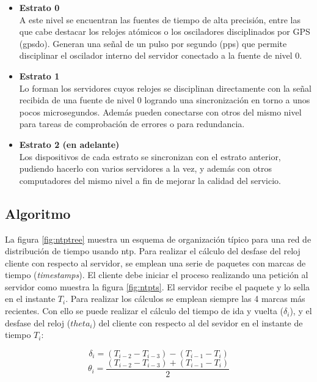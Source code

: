 \begin{itemize}
	\item \textbf{Estrato 0} \\ A este nivel se encuentran las fuentes de 
	tiempo de alta precisión, entre las que cabe destacar los relojes atómicos 
	o los osciladores disciplinados por GPS (\acrshort{gpsdo}). Generan una 
	señal de un pulso por segundo (\acrshort{pps}) que permite disciplinar el 
	oscilador interno del servidor conectado a la fuente de nivel 0.
	
	\item \textbf{Estrato 1} \\ Lo forman los servidores cuyos relojes se 
	disciplinan directamente con la señal recibida de una fuente de nivel 0 
	logrando una sincronización en torno a unos pocos microsegundos. Además 
	pueden conectarse con otros del mismo nivel para tareas de comprobación de 
	errores o para redundancia.
	
	\item \textbf{Estrato 2 (en adelante)} \\ Los dispositivos de cada estrato 
	se 
	sincronizan con el estrato anterior, pudiendo hacerlo con varios servidores 
	a la vez, y además con otros computadores del mismo nivel a 
	fin de mejorar la calidad del servicio.
\end{itemize}

\subsection{Algoritmo}

La figura \ref{fig:ntptree} muestra un esquema de organización típico para una 
red de distribución de tiempo usando \gls{ntp}. Para realizar el cálculo del 
desfase del reloj cliente con respecto al servidor, se emplean una serie de 
paquetes con marcas de tiempo (\textit{timestamps}). El cliente debe iniciar el 
proceso realizando una petición al servidor como muestra la figura 
\ref{fig:ntpts}. El servidor recibe el paquete y lo sella en el instante $T_i$. 
Para realizar los cálculos se emplean siempre las 4 marcas más recientes. Con 
ello se puede realizar el cálculo del tiempo de ida y vuelta ($\delta_i$), y el 
desfase del reloj ($theta_i$) del cliente con respecto al del sevidor en el 
instante de tiempo $T_i$:

\begin{equation}\label{ntprtt}
	\delta_i = (T_{i-2}-T_{i-3}) - (T_{i-1}-T_{i})
\end{equation}\label{ntpoffset}
\begin{equation}
	\theta_i = \frac{(T_{i-2}-T_{i-3}) + (T_{i-1}-T_{i})} {2}
\end{equation}

